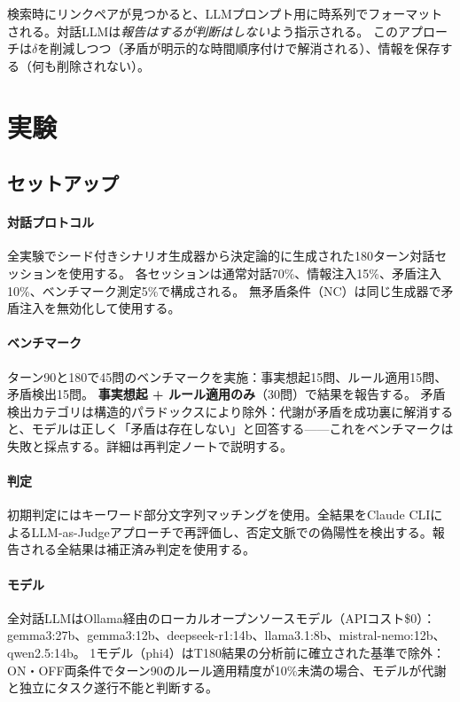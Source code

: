 \documentclass[11pt,a4paper]{article}
\begin{document}
検索時にリンクペアが見つかると、LLMプロンプト用に時系列でフォーマットされる。対話LLMは\emph{報告はするが判断はしない}よう指示される。
このアプローチは$\delta$を削減しつつ（矛盾が明示的な時間順序付けで解消される）、情報を保存する（何も削除されない）。

\section{実験}
\label{sec:experiments}

\subsection{セットアップ}
\label{sec:setup}

\paragraph{対話プロトコル}
全実験でシード付きシナリオ生成器から決定論的に生成された180ターン対話セッションを使用する。
各セッションは通常対話70\%、情報注入15\%、矛盾注入10\%、ベンチマーク測定5\%で構成される。
無矛盾条件（NC）は同じ生成器で矛盾注入を無効化して使用する。

\paragraph{ベンチマーク}
ターン90と180で45問のベンチマークを実施：事実想起15問、ルール適用15問、矛盾検出15問。
\textbf{事実想起 + ルール適用のみ}（30問）で結果を報告する。
矛盾検出カテゴリは構造的パラドックスにより除外：代謝が矛盾を成功裏に解消すると、モデルは正しく「矛盾は存在しない」と回答する——これをベンチマークは失敗と採点する。詳細は再判定ノートで説明する。

\paragraph{判定}
初期判定にはキーワード部分文字列マッチングを使用。全結果をClaude CLIによるLLM-as-Judgeアプローチで再評価し、否定文脈での偽陽性を検出する。報告される全結果は補正済み判定を使用する。

\paragraph{モデル}
全対話LLMはOllama経由のローカルオープンソースモデル（APIコスト\$0）：gemma3:27b、gemma3:12b、deepseek-r1:14b、llama3.1:8b、mistral-nemo:12b、qwen2.5:14b。
1モデル（phi4）はT180結果の分析前に確立された基準で除外：ON・OFF両条件でターン90のルール適用精度が10\%未満の場合、モデルが代謝と独立にタスク遂行不能と判断する。
\end{document}

